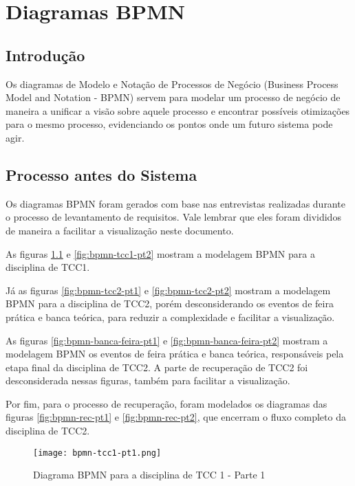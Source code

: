 \chapter{Diagramas BPMN}\label{chap:bpmn-appendix}

\section{Introdução}

Os diagramas de Modelo e Notação de Processos de Negócio (Business Process Model and Notation - BPMN) servem para modelar um processo de negócio de maneira a unificar a visão sobre aquele processo e encontrar possíveis otimizações para o mesmo processo, evidenciando os pontos onde um futuro sistema pode agir.

\section{Processo antes do Sistema}

Os diagramas BPMN foram gerados com base nas entrevistas realizadas durante o processo de levantamento de requisitos. Vale lembrar que eles foram divididos de maneira a facilitar a visualização neste documento.

As figuras \ref{fig:bpmn-tcc1-pt1} e \ref{fig:bpmn-tcc1-pt2} mostram a modelagem BPMN para a disciplina de TCC1.

Já as figuras \ref{fig:bpmn-tcc2-pt1} e \ref{fig:bpmn-tcc2-pt2} mostram a modelagem BPMN para a disciplina de TCC2, porém desconsiderando os eventos de feira prática e banca teórica, para reduzir a complexidade e facilitar a visualização.

As figuras \ref{fig:bpmn-banca-feira-pt1} e \ref{fig:bpmn-banca-feira-pt2} mostram a modelagem BPMN os eventos de feira prática e banca teórica, responsáveis pela etapa final da disciplina de TCC2. A parte de recuperação de TCC2 foi desconsiderada nessas figuras, também para facilitar a visualização.

Por fim, para o processo de recuperação, foram modelados os diagramas das figuras \ref{fig:bpmn-rec-pt1} e \ref{fig:bpmn-rec-pt2}, que encerram o fluxo completo da disciplina de TCC2.

\begin{figure}[H]
    \centering
    \texttt{[image: bpmn-tcc1-pt1.png]}
    \caption{Diagrama BPMN para a disciplina de TCC 1 - Parte 1}
    \label{fig:bpmn-tcc1-pt1}
\end{figure}

